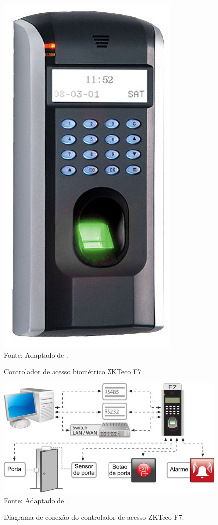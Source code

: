   \begin{figure}[!ht]
  \begin{center}
  \caption{Controlador de acesso biométrico ZKTeco F7}
  \includegraphics[scale=0.3]{figuras/cap3/zktecof7.jpg}\\
  Fonte: Adaptado de \cite{zktecof7}.
  \label{zktecof7}
  \end{center}
  \end{figure}


  \begin{figure}[!ht]
  \begin{center}
  \caption{Diagrama de conexão do controlador de acesso ZKTeco F7.}
  \includegraphics[scale=0.8]{figuras/cap3/diagrama_zktecof7.jpg}\\
  Fonte: Adaptado de \cite{zktecof7}.
  \label{diagrama_zktecof7}
  \end{center}
  \end{figure}


